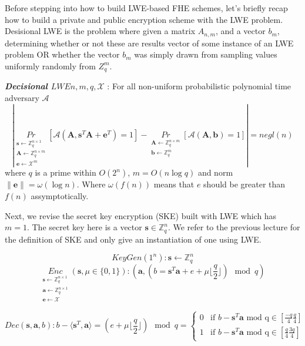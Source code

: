 \documentclass[usletter]{article}
\begin{document}
Before stepping into how to build LWE-based FHE schemes, let's briefly recap how to build a private and public encryption scheme with the LWE problem.
Desisional LWE is the problem where given a matrix $A_{n,m}$, and a vector $b_m$, determining whether or not these are results vector of some instance of an LWE problem OR whether the vector $b_m$ was simply 
drawn from sampling values uniformly randomly from $Z^{m}_{q}$. 
\begin{definition}
\textbf{\textit{Decisional $LWE{n,m,q,\mathcal{X}}$}} : For all non-uniform probabilistic polynomial time adversary $\mathcal{A}$
$$|\underset{\substack{
\pmb{s}\leftarrow \mathbb{Z}_q^{n\times1}\\
\pmb{A}\leftarrow\mathbb{Z}_q^{n\times m}\\
\pmb{e}\leftarrow \mathcal{X}^m}}{Pr}
[\mathcal{A}(\pmb{A},\pmb{s}^T\pmb{A}+\pmb{e}^T)=1]
-\underset{\substack{\pmb{A}\leftarrow\mathbb{Z}_q^{n\times m}\\
\pmb{b}\leftarrow\mathbb{Z}_q^m}}{Pr} 
[\mathcal{A}(\pmb{A},\pmb{b})=1]|=negl(n)$$
where $q$ is a prime within $O(2^n)$, $m=O(n\log q)$ and norm $\parallel \pmb{e}\parallel=\omega(\log n)$. Where $\omega(f(n))$ means that 
$e$ should be greater than $f(n)$ assymptotically.
\end{definition}


Next, we revise the secret key encryption (SKE) built with LWE which has $m=1$. The secret key here is a vector $\pmb{s} \in \mathbb{Z}_q^n$. We refer to the previous lecture for the definition of SKE and only give an instantiation of one using LWE.

$$KeyGen(1^n): \pmb{s}\leftarrow\mathbb{Z}_q^n$$
$$\underset{\substack{
\pmb{s}\leftarrow \mathbb{Z}_q^{n\times1}\\
\pmb{a}\leftarrow\mathbb{Z}_q^{n\times 1}\\
\pmb{e}\leftarrow \mathcal{X}}}{Enc}(\pmb{s},\mu\in\{0,1\}): (\pmb{a}, (b = \pmb{s}^T\pmb{a}+e+\mu\lfloor\frac{q}{2}\rfloor)\mod q)$$


$$Dec(\pmb{s},\pmb{a},b): b-\langle\pmb{s}^T,\pmb{a}\rangle=(e+\mu\lfloor\frac{q}{2}\rfloor) \mod q =   
  \begin{cases}
    0 & \text{if $b - \pmb{s}^T\pmb{a}$ mod q}  \in [\frac{-q}{4} \frac{q}{4} ] \\%
    1 & \text{if $b - \pmb{s}^T\pmb{a}$ mod q}  \in [\frac{q}{4} \frac{3q}{4} ]%
  \end{cases}$$
  
\end{document}

